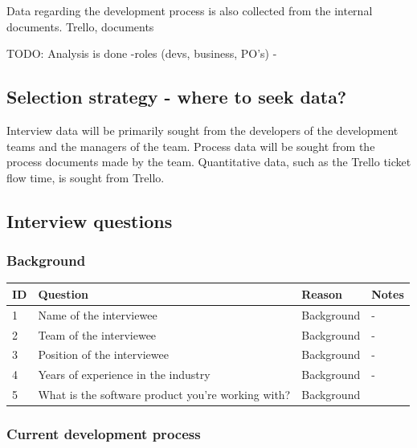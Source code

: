 \documentclass[english]{tktltiki2}
\theoremstyle{definition}
\theoremstyle{remark}
\begin{document}
Data regarding the development process is also collected from the internal documents.
Trello, documents

TODO: Analysis is done
 -roles (devs, business, PO's)
 -


\subsection{Selection strategy - where to seek data?}

Interview data will be primarily sought from the developers of the development teams and the managers of the team. Process data will be sought from the process documents made by the team. Quantitative data, such as the Trello ticket flow time, is sought from Trello. 

\subsection{Interview questions}

\subsubsection{Background}

\begin{center}
    \begin{tabular}{ | l | l | l | p{5cm} |}
    \hline
    ID & Question & Reason & Notes \\ \hline
    1 & Name of the interviewee & Background & - \\ \hline
    2 & Team of the interviewee & Background & - \\ \hline
    3 & Position of the interviewee & Background & - \\ \hline
    4 & Years of experience in the industry & Background & - \\ \hline
    5 & What is the software product you're working with? & Background &  \\ \hline
    \hline
    \end{tabular}
\end{center}

\subsubsection{Current development process}
\end{document}
